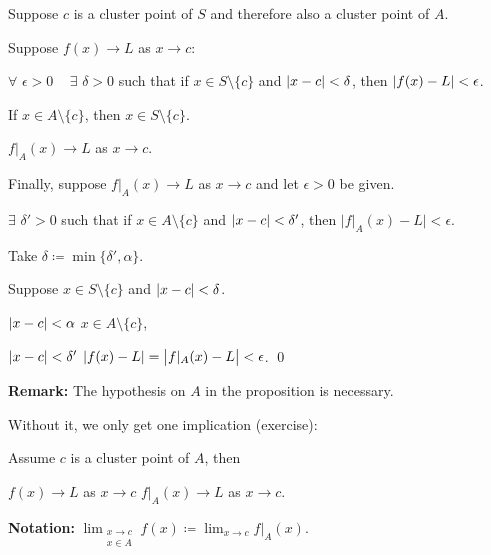 \documentclass[10pt,aspectratio=169]{beamer}
\begin{document}
\begin{frame}

Suppose $c$ is a cluster point of $S$ and therefore also a cluster point of $A$.

\pause
\medskip

Suppose $f(x) \to L$ as $x \to c$:

\pause
$\forall$ $\epsilon > 0$ ~ $\exists$ $\delta > 0$ such that if $x \in S \setminus \{ c \}$
and $\left\lvert {x-c} \right\rvert < \delta$, then $\left\lvert {f(x)-L} \right\rvert < \epsilon$.

\pause
If $x \in A \setminus \{ c \}$, then $x \in S \setminus \{ c \}$.

\pause
\thus \quad $f|_A(x) \to L$ as $x \to c$.

\pause
\medskip

Finally, suppose $f|_A(x) \to L$ as $x \to c$ and let $\epsilon > 0$ be
given.

\pause
$\exists$ $\delta' > 0$ such that if $x \in A \setminus \{ c \}$
and $\left\lvert {x-c} \right\rvert < \delta'$, then $\bigl\lvert f|_A(x)-L \bigr\rvert < \epsilon$.

\pause
Take $\delta \coloneqq \min \{ \delta', \alpha \}$.

\pause
Suppose $x \in S \setminus \{ c \}$ and
$\left\lvert {x-c} \right\rvert < \delta$.

\pause
$\left\lvert {x-c} \right\rvert < \alpha$ \wthus $x \in A \setminus \{ c \}$,

\pause
$\left\lvert {x-c} \right\rvert < \delta'$ \wthus $\left\lvert {f(x)-L} \right\rvert = \bigl\lvert f|_A(x)-L \bigr\rvert < \epsilon$.
\qed

\pause
\medskip

\textbf{Remark:}
The hypothesis on $A$ in the proposition is necessary.

\pause
Without it, we only get one implication (exercise):

\pause
Assume $c$ is a cluster point of $A$, then

$f(x) \to L$ as $x \to c$
\wthus
$f|_A(x) \to L$ as $x \to c$.

\pause
\medskip

\textbf{Notation:}
\quad $\displaystyle
\lim_{\substack{x \to c\\x \in A}} f(x) \coloneqq \lim_{x \to c} f|_A(x)$.

\end{frame}
\end{document}
